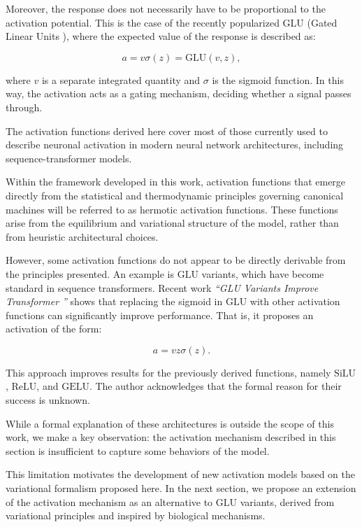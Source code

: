 \documentclass[12pt]{article}
\begin{document}
Moreover, the response does not necessarily have to be proportional to the activation potential. This is the case of the recently popularized $\text{GLU}$ (Gated Linear Units \cite{dauphin2017glu}), where the expected value of the response is described as:

\begin{equation}
a = v \sigma(z) = \text{GLU}(v,z) ,
\end{equation}

where $v$ is a separate integrated quantity and $\sigma$ is the sigmoid function. In this way, the activation acts as a gating mechanism, deciding whether a signal passes through.

The activation functions derived here cover most of those currently used to describe neuronal activation in modern neural network architectures, including sequence-transformer models.

Within the framework developed in this work, activation functions that emerge directly from the statistical and thermodynamic principles governing canonical machines will be referred to as hermotic activation functions. These functions arise from the equilibrium and variational structure of the model, rather than from heuristic architectural choices.

However, some activation functions do not appear to be directly derivable from the principles presented. An example is $\text{GLU}$ variants, which have become standard in sequence transformers. Recent work \emph{“GLU Variants Improve Transformer ”} \cite{shazeer2020glu} shows that replacing the sigmoid in $\text{GLU}$ with other activation functions can significantly improve performance. That is, it proposes an activation of the form:

\begin{equation}
a = v z \sigma(z) .
\end{equation}

This approach improves results for the previously derived functions, namely $\text{SiLU}$, $\text{ReLU}$, and $\text{GELU}$. The author acknowledges that the formal reason for their success is unknown.
  
While a formal explanation of these architectures is outside the scope of this work, we make a key observation: the activation mechanism described in this section is insufficient to capture some behaviors of the model.

This limitation motivates the development of new activation models based on the variational formalism proposed here. In the next section, we propose an extension of the activation mechanism as an alternative to $\text{GLU}$ variants, derived from variational principles and inspired by biological mechanisms.
\end{document}

